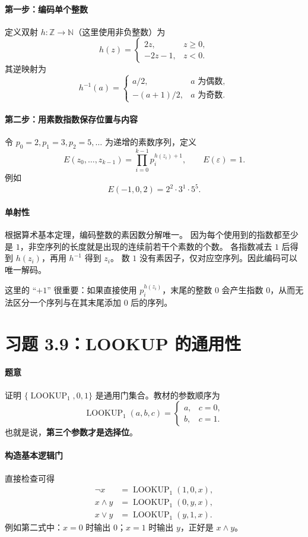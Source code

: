 \documentclass[UTF8,fontset=fandol,11pt,a4paper]{ctexart}
\newcommand{\LOOKUP}{\operatorname{LOOKUP}}
\begin{document}
\paragraph{第一步：编码单个整数}
定义双射 $h:\mathbb Z\to\mathbb N$（这里使用非负整数）为
\[
 h(z)=
 \begin{cases}
  2z,&z\ge0,\\
  -2z-1,&z<0.
 \end{cases}
\]
其逆映射为
\[
 h^{-1}(a)=
 \begin{cases}
  a/2,&a\text{ 为偶数},\\
  -(a+1)/2,&a\text{ 为奇数}.
 \end{cases}
\]

\paragraph{第二步：用素数指数保存位置与内容}
令 $p_0=2,p_1=3,p_2=5,\ldots$ 为递增的素数序列，定义
\[
 E(z_0,\ldots,z_{k-1})=\prod_{i=0}^{k-1}p_i^{h(z_i)+1},
 \qquad E(\varepsilon)=1.
\]
例如
\[
 E(-1,0,2)=2^2\cdot3^1\cdot5^5.
\]

\paragraph{单射性}
根据算术基本定理，编码整数的素因数分解唯一。
因为每个使用到的指数都至少是 $1$，非空序列的长度就是出现的连续前若干个素数的个数。
各指数减去 $1$ 后得到 $h(z_i)$，再用 $h^{-1}$ 得到 $z_i$。
数 $1$ 没有素因子，仅对应空序列。因此编码可以唯一解码。

这里的 ``$+1$'' 很重要：如果直接使用 $p_i^{h(z_i)}$，末尾的整数 $0$
会产生指数 $0$，从而无法区分一个序列与在其末尾添加 $0$ 后的序列。

\section{习题 3.9：LOOKUP 的通用性}

\paragraph{题意}
证明 $\{\LOOKUP_1,0,1\}$ 是通用门集合。教材的参数顺序为
\[
 \LOOKUP_1(a,b,c)=
 \begin{cases}
  a,&c=0,\\
  b,&c=1.
 \end{cases}
\]
也就是说，\textbf{第三个参数才是选择位}。

\paragraph{构造基本逻辑门}
直接检查可得
\begin{align*}
 \neg x&=\LOOKUP_1(1,0,x),\\
 x\land y&=\LOOKUP_1(0,y,x),\\
 x\lor y&=\LOOKUP_1(y,1,x).
\end{align*}
例如第二式中：$x=0$ 时输出 $0$；$x=1$ 时输出 $y$，正好是 $x\land y$。
\end{document}

